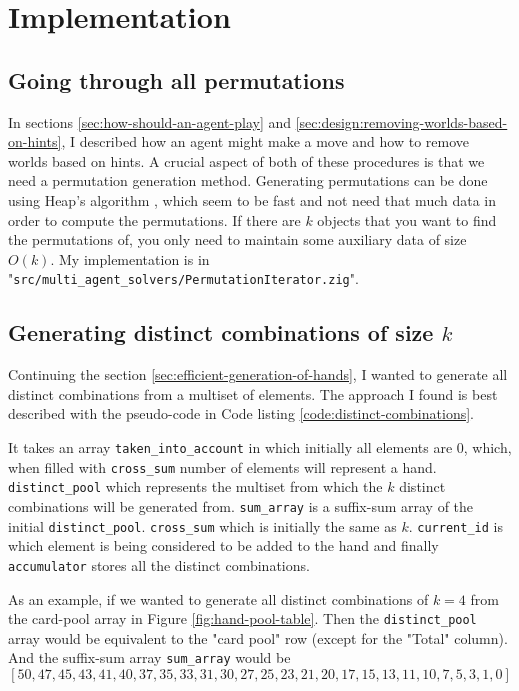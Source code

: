 \section{Implementation}

\subsection{Going through all permutations}
In sections \ref{sec:how-should-an-agent-play} and \ref{sec:design:removing-worlds-based-on-hints}, I described how an agent might make a move and how to remove worlds based on hints.
A crucial aspect of both of these procedures is that we need a permutation generation method.
Generating permutations can be done using Heap's algorithm \cite{wiki:heapsalgorithm}, which seem to be fast and not need that much data in order to compute the permutations.
If there are $k$ objects that you want to find the permutations of, you only need to maintain some auxiliary data of size $O(k)$.
My implementation is in "{\tt src/multi\_agent\_solvers/PermutationIterator.zig}". 


\subsection{Generating distinct combinations of size $k$} \label{implementation:sec:generating-distinct-combinations}
Continuing the section \ref{sec:efficient-generation-of-hands}, I wanted to generate all distinct combinations from a multiset of elements.
The approach I found is best described with the pseudo-code in Code listing \ref{code:distinct-combinations}. 

It takes an array {\tt  taken\_into\_account} in which initially all elements are 0, which, when filled with {\tt cross\_sum} number of elements will represent a hand.
{\tt distinct\_pool} which represents the multiset from which the $k$ distinct combinations will be generated from.
{\tt sum\_array} is a suffix-sum array of the initial {\tt distinct\_pool}.
{\tt cross\_sum} which is initially the same as $k$.
{\tt current\_id} is which element is being considered to be added to the hand and finally {\tt accumulator} stores all the distinct combinations.

As an example, if we wanted to generate all distinct combinations of $k=4$ from the card-pool array in Figure \ref{fig:hand-pool-table}.
Then the {\tt distinct\_pool} array would be equivalent to the "card pool" row (except for the "Total" column).
And the suffix-sum array {\tt sum\_array} would be
\[
[50, 47, 45, 43, 41, 40, 37, 35, 33, 31, 30, 27, 25, 23, 21, 20, 17, 15, 13, 11, 10, 7, 5, 3, 1, 0]
\]

